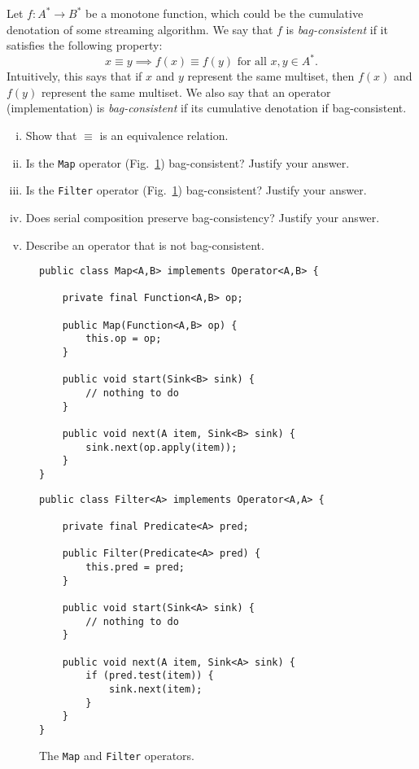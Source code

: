 \documentclass[11pt]{article}
\newcommand{\mnt}[1]{{\small\texttt{#1}}}
\newcommand{\eq}{\equiv}
\newcommand{\kstar}{^{\textstyle *}}
\begin{document}
\begin{enumerate}[(A)]
Let $f: A\kstar \to B\kstar$ be a monotone function, which could be the cumulative denotation of some streaming algorithm. We say that $f$ is \emph{bag-consistent} if it satisfies the following property:
\[
  x \eq y \implies f(x) \eq f(y)
  \text{ for all $x, y \in A\kstar$}.
\]
%
Intuitively, this says that if $x$ and $y$ represent the same multiset, then $f(x)$ and $f(y)$ represent the same multiset.
%
We also say that an operator (implementation) is \emph{bag-consistent} if its cumulative denotation if bag-consistent.
\begin{enumerate}[(i)]
\item
Show that $\eq$ is an equivalence relation.
\item
Is the \mnt{Map} operator (Fig.~\ref{fig:operators}) bag-consistent? Justify your answer.
\item
Is the \mnt{Filter} operator (Fig.~\ref{fig:operators}) bag-consistent? Justify your answer.
\item
Does serial composition preserve bag-consistency? Justify your answer.
\item
Describe an operator that is not bag-consistent.
\end{enumerate}
\end{enumerate}

\begin{figure}[t]
\scriptsize\centering
\begin{minipage}[t]{0.46\textwidth}
\begin{verbatim}
public class Map<A,B> implements Operator<A,B> {

	private final Function<A,B> op;

	public Map(Function<A,B> op) {
		this.op = op;
	}

	public void start(Sink<B> sink) {
		// nothing to do
	}

	public void next(A item, Sink<B> sink) {
		sink.next(op.apply(item));
	}
}
\end{verbatim}
\end{minipage}
\quad
\begin{minipage}[t]{0.46\textwidth}
\begin{verbatim}
public class Filter<A> implements Operator<A,A> {

	private final Predicate<A> pred;

	public Filter(Predicate<A> pred) {
		this.pred = pred;
	}

	public void start(Sink<A> sink) {
		// nothing to do
	}

	public void next(A item, Sink<A> sink) {
		if (pred.test(item)) {
			sink.next(item);
		}
	}
}
\end{verbatim}
\end{minipage}
\caption{The \mnt{Map} and \mnt{Filter} operators.}
\label{fig:operators}
\end{figure}
\end{document}
